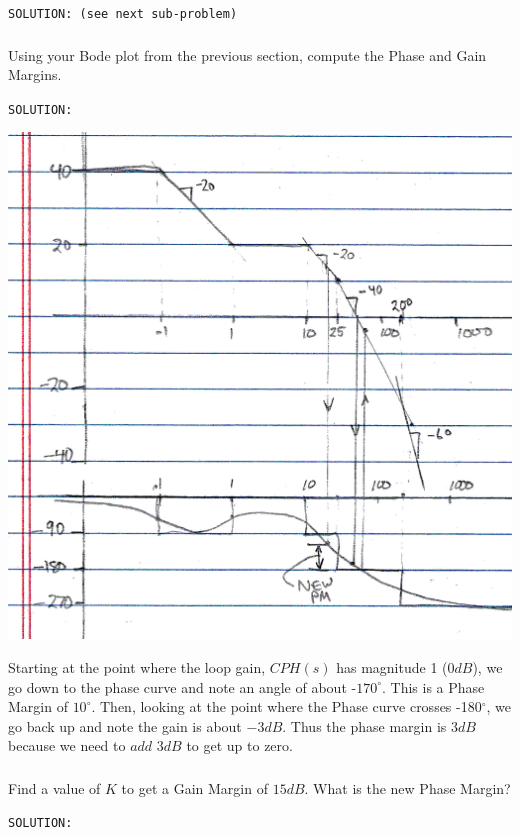 \documentclass{article}	%
\begin{document}
{\tt SOLUTION: (see next sub-problem)} 


\subsubsection{}   Using your Bode plot from the previous section, compute the Phase and Gain Margins.

{\tt SOLUTION: }

\includegraphics[width=5.5in]{bode_gm_pm}

Starting at the point where the loop gain, $CPH(s)$ has magnitude 1 (0$dB$), we go down to the phase curve and note an angle of about -$170^\circ$.  This is a Phase Margin of $10^\circ$.
Then, looking at the point where the Phase curve crosses -180$^\circ$, we go back up and note the gain is about $-3dB$. Thus the phase margin is $3dB$ because we need to $add$ $3dB$ to get up to zero.


\subsubsection{}  Find a value of $K$ to get a Gain Margin of $15dB$.  What is the new Phase Margin?

{\tt SOLUTION: }
\end{document}
